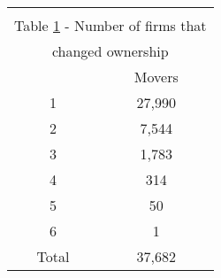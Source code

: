   \begin{longtable}{cc}\\
  	\label{tab:movers}\\
  	\multicolumn{2}{c}{Table \ref{tab:movers} - Number of firms that }\\
  		\multicolumn{2}{c}{changed ownership}\\ \hline \hline
            &\multicolumn{1}{c}{Movers}\\
\hline
1           &       27,990\\
2           &        7,544\\
3           &        1,783\\
4           &         314\\
5           &          50\\
6           &           1\\
\hline
Total       &       37,682\\
\hline
\end{longtable}
